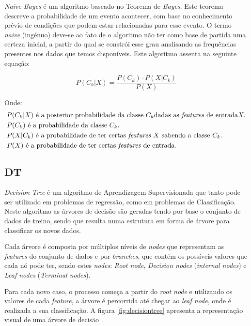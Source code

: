 \documentclass[12pt,a4paper,twoside]{report}
\begin{document}
{\textit{Naive Bayes} é um algoritmo baseado no Teorema de \textit{Bayes}. Este teorema descreve a probabilidade de um evento acontecer, com base no conhecimento prévio de condições que podem estar relacionadas para esse evento. O termo \textit{naive} (ingénuo) deve-se ao fato de o algoritmo não ter como base de partida uma certeza inicial, a partir do qual se constrói esse grau analisando as frequências presentes nos dados que temos disponíveis. Este algoritmo assenta na seguinte equação:

\begin{equation}
P(C_k | X) = \frac{P(C_k) \cdot P(X | C_k)}{P(X)}
\end{equation}

Onde:
\begin{align*}
& P(C_k | X) \text{ é a posterior probabilidade da classe } C_k \text{dadas as \textit{features} de entrada} X. \\
& P(C_k) \text{ é a probabilidade da classe } C_k. \\
& P(X | C_k) \text{ é a probabilidade de ter certas \textit{features} } X \text{ sabendo a classe } C_k. \\
& P(X) \text{ é a probabilidade de ter certas \textit{features} de entrada.}
\end{align*}


\subsection{\gls{DT}}

\textit{Decision Tree} é um algoritmo de Aprendizagem Supervisionada que tanto pode ser utilizado em problemas de regressão, como em problemas de Classificação. Neste algoritmo as árvores de decisão são geradas tendo por base o conjunto de dados de treino, sendo que resulta numa estrutura em forma de árvore para classificar os novos dados.

Cada árvore é composta por múltiplos níveis de \textit{nodes} que representam as \textit{features} do conjunto de dados e por \textit{branches}, que contém os possíveis valores que cada nó pode ter, sendo estes \textit{nodes}: \textit{Root node}, \textit{Decision nodes} (\textit{internal nodes}) e \textit{Leaf nodes} (\textit{Terminal nodes}).  

Para cada novo caso, o processo começa a partir do \textit{root node} e utilizando os valores de cada \textit{feature}, a árvore é percorrida até chegar ao \textit{leaf node}, onde é realizada a sua classificação. A figura \ref{fig:decisiontree} apresenta a representação visual de uma árvore de decisão \cite{Uddin2019ComparingDS}.

}
\end{document}
